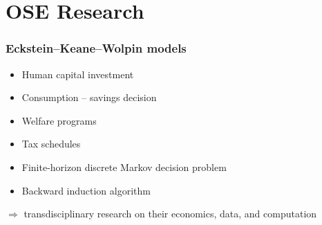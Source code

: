\section{OSE Research}
\begin{frame}\frametitle{Eckstein--Keane--Wolpin models}

\begin{multicols}{2}

	\vspace{0.3cm}
	\begin{itemize}\setlength\itemsep{1em}
		\item Human capital investment
		\item Consumption -- savings decision
	\end{itemize}

    \pause

	\vspace{0.3cm}
	\begin{itemize}\setlength\itemsep{1em}
		\item Welfare programs
		\item Tax schedules
	\end{itemize}

\end{multicols}

 \pause
{}\vspace{0.3cm}
\begin{itemize}\setlength\itemsep{1em}
	\item Finite-horizon discrete Markov decision problem
	\item Backward induction algorithm
\end{itemize}


\pause

\hspace{0.3cm}$\Rightarrow$ transdisciplinary research on their \alert<4>{economics}, \alert<5>{data}, and \alert<6>{computation}

\end{frame}

